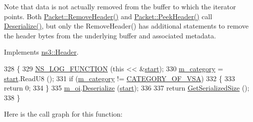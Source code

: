 Note that data is not actually removed from the buffer to which the iterator points. Both \hyperlink{classns3_1_1Packet_a0961eccf975d75f902d40956c93ba63e}{Packet\+::\+Remove\+Header()} and \hyperlink{classns3_1_1Packet_aadc63487bea70945c418f4c3e9b81964}{Packet\+::\+Peek\+Header()} call \hyperlink{classns3_1_1VendorSpecificActionHeader_a8a976570912a0ac4c0fafbaafd4a9ee4}{Deserialize()}, but only the Remove\+Header() has additional statements to remove the header bytes from the underlying buffer and associated metadata. 

Implements \hyperlink{classns3_1_1Header_a78be9400bb66b2a8543606f395ef5396}{ns3\+::\+Header}.


\begin{DoxyCode}
328 \{
329   \hyperlink{log-macros-disabled_8h_a90b90d5bad1f39cb1b64923ea94c0761}{NS\_LOG\_FUNCTION} (\textcolor{keyword}{this} << &\hyperlink{namespacevisualizer_1_1core_a2a35e5d8a34af358b508dac8635754e0}{start});
330   \hyperlink{classns3_1_1VendorSpecificActionHeader_a2fc4b586a5cbba95b3a7e64b50f5d719}{m\_category} = \hyperlink{namespacevisualizer_1_1core_a2a35e5d8a34af358b508dac8635754e0}{start}.ReadU8 ();
331   \textcolor{keywordflow}{if} (\hyperlink{classns3_1_1VendorSpecificActionHeader_a2fc4b586a5cbba95b3a7e64b50f5d719}{m\_category} != \hyperlink{namespacens3_aded86438827ae4ff341e6ecb0a5f38b6}{CATEGORY\_OF\_VSA})
332     \{
333       \textcolor{keywordflow}{return} 0;
334     \}
335   \hyperlink{classns3_1_1VendorSpecificActionHeader_a026ab2e6e0cd5fdc3270f8fcefc95db4}{m\_oi}.\hyperlink{classns3_1_1OrganizationIdentifier_a9f42c40d01c68a5a4657af828225bce2}{Deserialize} (\hyperlink{namespacevisualizer_1_1core_a2a35e5d8a34af358b508dac8635754e0}{start});
336 
337   \textcolor{keywordflow}{return} \hyperlink{classns3_1_1VendorSpecificActionHeader_ac06b54f4fa02b0e05519ec413fbaf706}{GetSerializedSize} ();
338 \}
\end{DoxyCode}


Here is the call graph for this function\+:



